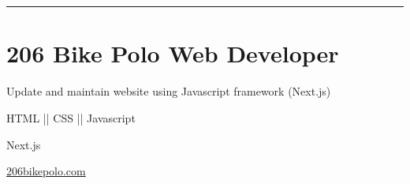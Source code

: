 
\vspace{3.4ex}
\section{}{}

{\hspace{-1.72in}\noindent\color{cblue}{SOFTWARE PROJECTS} }

\vspace{-1.6ex}
{\hspace{-1.73in}\noindent\color{dblue}\rule{6.935in}{0.4pt}}

\vspace{2.4ex}


\section{
    \textbf{206 Bike Polo} \newline
    Web Developer
}{}

\begin{detail}
    \BulletItem
    Update and maintain website using Javascript framework (Next.js)
\end{detail}

\begin{subtitle}
    \vspace{-5ex}
    {{}} 
\end{subtitle}

\vspace{-1.5ex}
{
    \vspace{-0.8ex}
    \color{cyan}\small
    {HTML || CSS || Javascript}
}

{
    \vspace{-2.5ex}\hspace{1.5in}
    \color{cyan}\small
    {Next.js}
}

{
    \vspace{-2.5ex}\hspace{3in}
    \color{blue}\small
    {\href{https://www.206bikepolo.com}{206bikepolo.com}{}}
}


\vspace{2.5ex}


